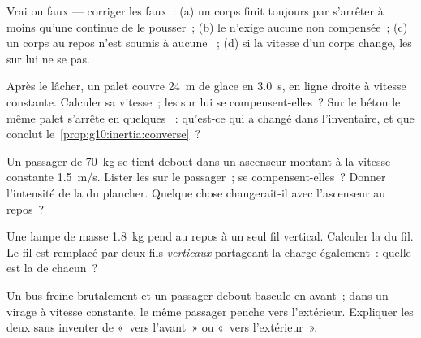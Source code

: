 \begin{exercise}[$\star$]\label{exo:g10:inertia:5}
Vrai ou faux --- corriger les faux~: (a) un corps finit toujours par
s'arrêter à moins qu'une  continue de le pousser~;
(b) le  n'exige aucune
 non compensée~; (c) un corps au repos n'est soumis à
aucune ~; (d) si la vitesse d'un corps change, les
 sur lui ne se  pas.
\end{exercise}

\begin{exercise}[$\star\star$]\label{exo:g10:inertia:6}
Après le lâcher, un palet couvre \qty{24}{m} de glace en \qty{3.0}{s},
en ligne droite à vitesse constante. Calculer sa vitesse~; les
 sur lui se compensent-elles~? Sur le
béton le même palet s'arrête en quelques ~: qu'est-ce
qui a changé dans l'inventaire, et que conclut
le~\cref{prop:g10:inertia:converse}~?
\end{exercise}

\begin{exercise}[$\star\star$]\label{exo:g10:inertia:7}
Un passager de \qty{70}{kg} se tient debout dans un ascenseur montant
à la vitesse constante \qty{1.5}{m/s}. Lister les
 sur le passager~; se compensent-elles~?
Donner l'intensité de la  du plancher. Quelque chose
changerait-il avec l'ascenseur au repos~?
\end{exercise}

\begin{exercise}[$\star\star$]\label{exo:g10:inertia:8}
Une lampe de masse \qty{1.8}{kg} pend au repos à un seul fil vertical.
Calculer la  du fil. Le fil est remplacé par deux
fils \emph{verticaux} partageant la charge également~: quelle est la
 de chacun~?
\end{exercise}

\begin{exercise}[$\star\star$]\label{exo:g10:inertia:9}
Un bus freine brutalement et un passager debout bascule en avant~; dans
un virage à vitesse constante, le même passager penche vers
l'extérieur. Expliquer les deux sans inventer de 
«~vers l'avant~» ou «~vers l'extérieur~».
\end{exercise}


